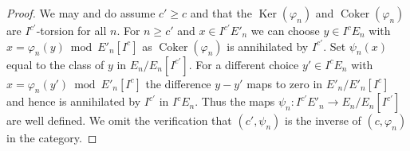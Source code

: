 \documentclass[10pt,a4paper]{amsart}
\theoremstyle{plain}
\theoremstyle{definition}
\theoremstyle{remark}
\numberwithin{equation}{subsection}
\def\Ker{\mathop{\mathrm{Ker}}}
\def\Coker{\mathop{\mathrm{Coker}}}
\begin{document}
\begin{proof}
We may and do assume $c' \geq c$ and that the
$\Ker(\varphi_n)$ and $\Coker(\varphi_n)$ are $I^{c'}$-torsion
for all $n$. For $n \geq c'$ and
$x \in I^{c'}E'_n$ we can choose $y \in I^cE_n$ with
$x = \varphi_n(y) \bmod E'_n[I^c]$ as $\Coker(\varphi_n)$
is annihilated by $I^{c'}$. Set $\psi_n(x)$ equal to the class of
$y$ in $E_n/E_n[I^{c'}]$. For a different choice $y' \in I^cE_n$
with $x = \varphi_n(y') \bmod E'_n[I^c]$ the difference
$y - y'$ maps to zero in $E'_n/E'_n[I^c]$ and hence is
annihilated by $I^{c'}$ in $I^cE_n$. Thus the maps
$\psi_n : I^{c'}E'_n \to E_n/E_n[I^{c'}]$
are well defined.
We omit the verification that $(c', \psi_n)$ is the inverse of
$(c, \varphi_n)$ in the category.
\end{proof}
\end{document}
